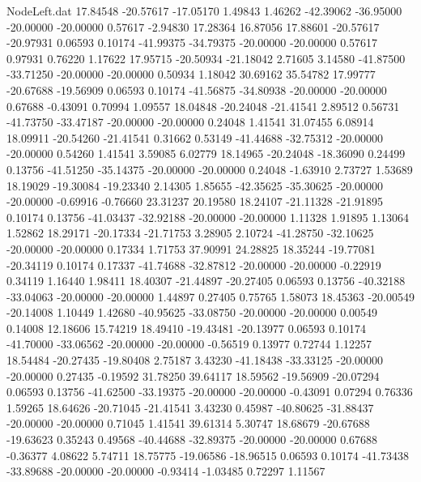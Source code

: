 \begin{filecontents}{NodeLeft.dat}
  17.84548  -20.57617  -17.05170     1.49843    1.46262  -42.39062  -36.95000  -20.00000  -20.00000    0.57617   -2.94830   17.28364   16.87056
  17.88601  -20.57617  -20.97931     0.06593    0.10174  -41.99375  -34.79375  -20.00000  -20.00000    0.57617    0.97931    0.76220    1.17622
  17.95715  -20.50934  -21.18042     2.71605    3.14580  -41.87500  -33.71250  -20.00000  -20.00000    0.50934    1.18042   30.69162   35.54782
  17.99777  -20.67688  -19.56909     0.06593    0.10174  -41.56875  -34.80938  -20.00000  -20.00000    0.67688   -0.43091    0.70994    1.09557
  18.04848  -20.24048  -21.41541     2.89512    0.56731  -41.73750  -33.47187  -20.00000  -20.00000    0.24048    1.41541   31.07455    6.08914
  18.09911  -20.54260  -21.41541     0.31662    0.53149  -41.44688  -32.75312  -20.00000  -20.00000    0.54260    1.41541    3.59085    6.02779
  18.14965  -20.24048  -18.36090     0.24499    0.13756  -41.51250  -35.14375  -20.00000  -20.00000    0.24048   -1.63910    2.73727    1.53689
  18.19029  -19.30084  -19.23340     2.14305    1.85655  -42.35625  -35.30625  -20.00000  -20.00000   -0.69916   -0.76660   23.31237   20.19580
  18.24107  -21.11328  -21.91895     0.10174    0.13756  -41.03437  -32.92188  -20.00000  -20.00000    1.11328    1.91895    1.13064    1.52862
  18.29171  -20.17334  -21.71753     3.28905    2.10724  -41.28750  -32.10625  -20.00000  -20.00000    0.17334    1.71753   37.90991   24.28825
  18.35244  -19.77081  -20.34119     0.10174    0.17337  -41.74688  -32.87812  -20.00000  -20.00000   -0.22919    0.34119    1.16440    1.98411
  18.40307  -21.44897  -20.27405     0.06593    0.13756  -40.32188  -33.04063  -20.00000  -20.00000    1.44897    0.27405    0.75765    1.58073
  18.45363  -20.00549  -20.14008     1.10449    1.42680  -40.95625  -33.08750  -20.00000  -20.00000    0.00549    0.14008   12.18606   15.74219
  18.49410  -19.43481  -20.13977     0.06593    0.10174  -41.70000  -33.06562  -20.00000  -20.00000   -0.56519    0.13977    0.72744    1.12257
  18.54484  -20.27435  -19.80408     2.75187    3.43230  -41.18438  -33.33125  -20.00000  -20.00000    0.27435   -0.19592   31.78250   39.64117
  18.59562  -19.56909  -20.07294     0.06593    0.13756  -41.62500  -33.19375  -20.00000  -20.00000   -0.43091    0.07294    0.76336    1.59265
  18.64626  -20.71045  -21.41541     3.43230    0.45987  -40.80625  -31.88437  -20.00000  -20.00000    0.71045    1.41541   39.61314    5.30747
  18.68679  -20.67688  -19.63623     0.35243    0.49568  -40.44688  -32.89375  -20.00000  -20.00000    0.67688   -0.36377    4.08622    5.74711
  18.75775  -19.06586  -18.96515     0.06593    0.10174  -41.73438  -33.89688  -20.00000  -20.00000   -0.93414   -1.03485    0.72297    1.11567

\end{filecontents}
